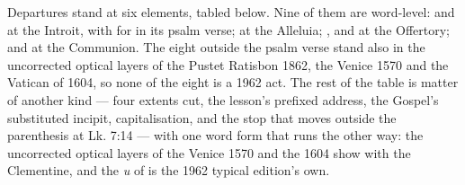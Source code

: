 Departures stand at six elements, tabled below. Nine of them are word-level:
 and  at the Introit, with  for
 in its psalm verse;  at the Alleluia;
,  and  at the
Offertory;  and  at the Communion. The eight outside
the psalm verse stand also in the uncorrected optical layers of the Pustet
Ratisbon 1862, the Venice 1570 and the Vatican  of 1604, so none
of the eight is a 1962 act. The rest of the table is matter of another kind ---
four extents cut, the lesson's prefixed address, the Gospel's substituted
incipit, capitalisation, and the stop that moves outside the parenthesis at Lk.
7:14 --- with one word form that runs the other way: the uncorrected optical
layers of the Venice 1570 and the 1604  show 
with the Clementine, and the \emph{u} of  is the 1962 typical
edition's own.

